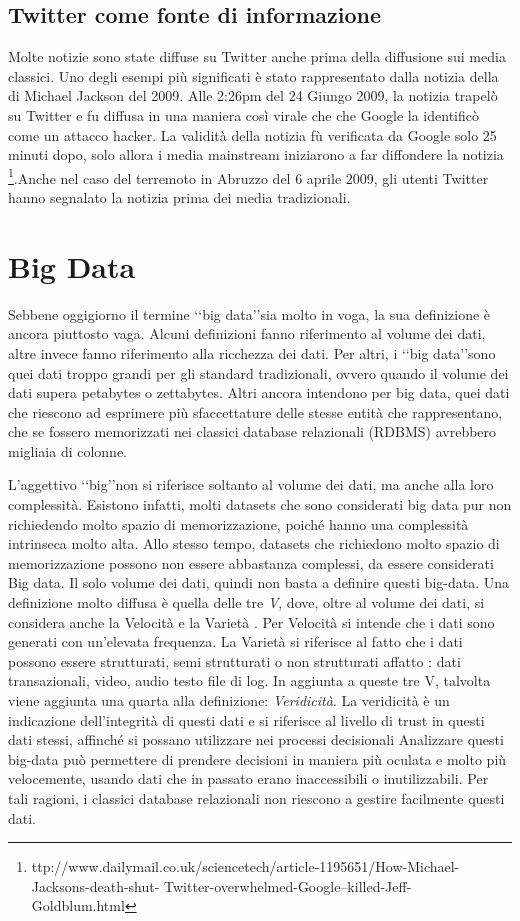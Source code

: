 \subsection{Twitter come fonte di informazione}
Molte notizie sono state diffuse su Twitter anche prima della diffusione sui media classici. Uno degli esempi più significati è stato rappresentato dalla notizia della di Michael Jackson del 2009. Alle 2:26pm
del 24 Giungo 2009, la notizia trapelò su Twitter e fu diffusa in una maniera così virale che che Google la identificò come un attacco hacker. La validità della notizia fù verificata da Google solo 25 minuti dopo,   solo allora i media mainstream iniziarono a far diffondere la notizia \footnote{ttp://www.dailymail.co.uk/sciencetech/article-1195651/How-Michael-Jacksons-death-shut-
Twitter-overwhelmed-Google–killed-Jeff-Goldblum.html}.Anche nel caso del terremoto in Abruzzo del 6 aprile 2009, gli utenti Twitter hanno segnalato la notizia prima dei media tradizionali. 
\section{Big Data}
Sebbene oggigiorno il termine \lq\lq big data\rq\rq sia molto in voga, la sua definizione è ancora piuttosto vaga. Alcuni definizioni fanno riferimento al volume dei dati, altre  invece fanno riferimento alla ricchezza dei dati. Per altri, i \lq\lq big data\rq\rq sono   quei dati troppo grandi per gli standard tradizionali, ovvero quando il volume dei dati supera petabytes o zettabytes. Altri ancora intendono per big data, quei dati che riescono ad esprimere più sfaccettature delle stesse entità che rappresentano, che se fossero memorizzati nei classici database relazionali (RDBMS) avrebbero migliaia di colonne. 

L'aggettivo \lq\lq big\rq\rq non si riferisce soltanto al volume dei dati, ma anche alla loro complessità. Esistono infatti, molti   datasets che  sono considerati big data  pur non richiedendo  molto spazio di memorizzazione, poiché hanno una complessità intrinseca molto alta. Allo stesso tempo, datasets che richiedono molto spazio di memorizzazione possono non essere abbastanza complessi, da essere considerati Big data. Il solo volume dei dati, quindi non basta a definire questi big-data. Una definizione molto diffusa è quella delle tre \emph{V}, dove, oltre al volume dei dati, si considera anche la Velocità e la Varietà .
Per Velocità si intende che i dati sono generati con un'elevata frequenza.
La Varietà si riferisce al fatto che i dati possono essere  strutturati, semi strutturati o non strutturati affatto : dati transazionali, video, audio testo file di log.
In aggiunta a queste tre V, talvolta viene aggiunta una quarta alla definizione: \emph{Veridicità}.
La veridicità è un indicazione dell'integrità di questi dati e si riferisce al livello di trust in questi dati stessi, affinché si possano utilizzare nei processi decisionali
Analizzare questi big-data può permettere  di prendere decisioni in maniera più oculata e molto più velocemente, usando dati che in passato erano inaccessibili o inutilizzabili.
Per tali ragioni, i classici database relazionali non riescono a gestire facilmente questi dati.

